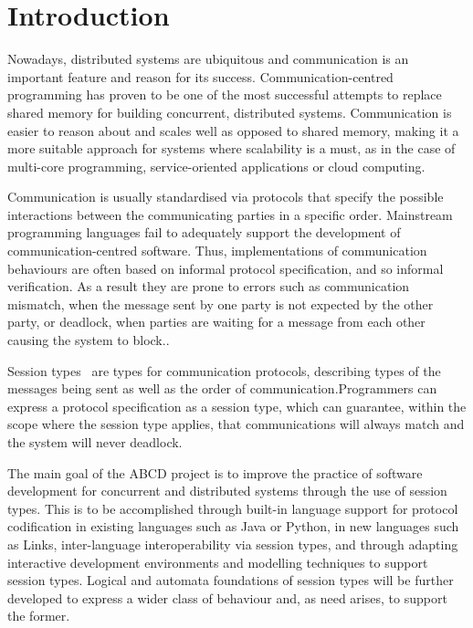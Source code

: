 \section{Introduction}

Nowadays, distributed systems are ubiquitous and communication is an important feature and reason for its success. Communication-centred programming has proven to be one of the most successful attempts to replace shared memory for building concurrent, distributed systems. Communication is easier to reason about and scales well as opposed to shared memory, making it a more suitable approach for systems where scalability is a must, as in the case of multi-core programming, service-oriented applications or cloud computing\cite{abcd}.

Communication is usually standardised via protocols that specify the possible interactions between the communicating parties in a specific order. Mainstream programming languages fail to adequately support the development of communication-centred software. Thus, implementations of communication behaviours are often based on informal protocol specification, and so informal verification. As a result they are prone to errors such as communication mismatch, when the message sent by one party is not expected by the other party, or deadlock, when parties are waiting for a message from each other causing the system to block.\cite{abcd}.

Session types~\cite{HondaK:typdi, HondaK:intblt1, HondaK:lanptd} are types for communication protocols, describing types of the messages being sent as well as the order of communication.Programmers can express a protocol specification as a session type, which can guarantee, within the scope where the session type applies, that communications will always match and the system will never deadlock.

The main goal of the ABCD project\cite{abcd} is to improve the practice of software development for concurrent and distributed systems through the use of session types. This is to be accomplished through built-in language support for protocol codification in existing languages such as Java or Python, in new languages such as Links\cite{links}, inter-language interoperability via session types, and through adapting interactive development environments and modelling techniques to support session types. Logical and automata foundations of session types will be further developed to express a wider class of behaviour and, as need arises, to support the former. 


